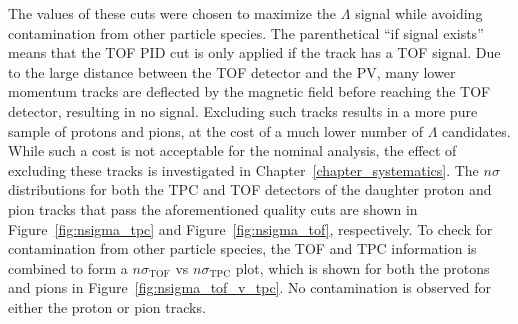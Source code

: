The values of these cuts were chosen to maximize the $\Lambda$ signal while avoiding contamination from other particle species. The parenthetical ``if signal exists'' means that the TOF PID cut is only applied if the track has a TOF signal. Due to the large distance between the TOF detector and the PV, many lower momentum tracks are deflected by the magnetic field before reaching the TOF detector, resulting in no signal. Excluding such tracks results in a more pure sample of protons and pions, at the cost of a much lower number of $\Lambda$ candidates. While such a cost is not acceptable for the nominal analysis, the effect of excluding these tracks is investigated in Chapter~\ref{chapter_systematics}. The $n\sigma$ distributions for both the TPC and TOF detectors of the daughter proton and pion tracks that pass the aforementioned quality cuts are shown in Figure~\ref{fig:nsigma_tpc} and Figure~\ref{fig:nsigma_tof}, respectively. To check for contamination from other particle species, the TOF and TPC information is combined to form a $n\sigma_{\text{TOF}}$ vs $n\sigma_{\text{TPC}}$ plot, which is shown for both the protons and pions in Figure~\ref{fig:nsigma_tof_v_tpc}. No contamination is observed for either the proton or pion tracks.

